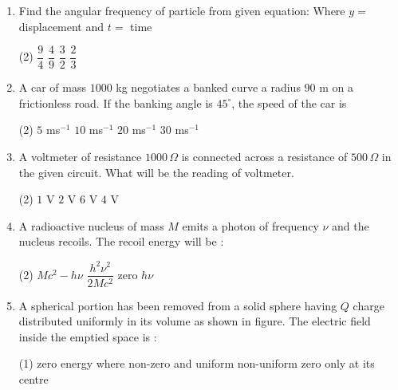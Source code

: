 \documentclass[twocolumn]{article}
\renewcommand{\frac}[2]{\dfrac{#1}{#2}}
\begin{document}
\begin{enumerate}
    \item Find the angular frequency of particle from given equation: Where \( y = \) displacement and \( t = \) time
    \begin{tasks}(2)
        \task \( \frac{9}{4} \)
        \task \( \frac{4}{9} \)
        \task \( \frac{3}{2} \)
        \task \( \frac{2}{3} \)
    \end{tasks}
    
    \item A car of mass \( 1000 \) kg negotiates a banked curve a radius \( 90 \) m on a frictionless road. If the banking angle is \( 45^\circ \), the speed of the car is
    \begin{tasks}(2)
        \task \( 5 \) ms\(^{-1} \)
        \task \( 10 \) ms\(^{-1} \)
        \task \( 20 \) ms\(^{-1} \)
        \task \( 30 \) ms\(^{-1} \)
    \end{tasks}
    
    \item A voltmeter of resistance \( 1000 \, \Omega \) is connected across a resistance of \( 500 \, \Omega \) in the given circuit. What will be the reading of voltmeter.
    \begin{center}
    \end{center}
    \begin{tasks}(2)
        \task \( 1 \) V
        \task \( 2 \) V
        \task \( 6 \) V
        \task \( 4 \) V
    \end{tasks}
    
    \item A radioactive nucleus of mass \( M \) emits a photon of frequency \( \nu \) and the nucleus recoils. The recoil energy will be :
    \begin{tasks}(2)
        \task \( Mc^2 - h\nu \)
        \task \( \frac{h^2\nu^2}{2Mc^2} \)
        \task zero
        \task \( h\nu \)
    \end{tasks}
    
    \item A spherical portion has been removed from a solid sphere having \( Q \) charge distributed uniformly in its volume as shown in figure. The electric field inside the emptied space is :
    \begin{center}
    \end{center}
    \begin{tasks}(1)
        \task zero energy where
        \task non-zero and uniform
        \task non-uniform
        \task zero only at its centre
    \end{tasks}
    

\end{enumerate}
\end{document}

